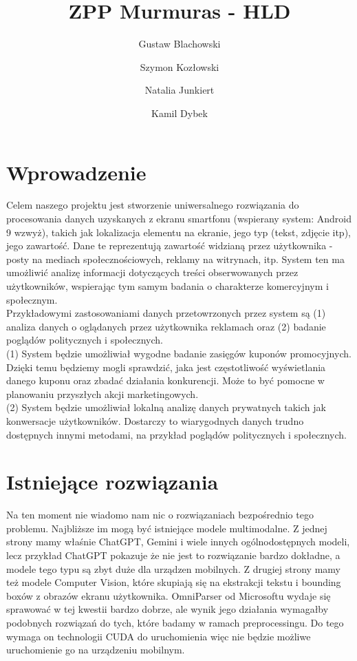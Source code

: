 \documentclass[12pt]{article}
\title{ZPP Murmuras - HLD}
\author{Gustaw Blachowski \and Szymon Kozłowski \and Natalia Junkiert \and Kamil Dybek}
\date{}
\begin{document}
\maketitle

\section*{Wprowadzenie}

Celem naszego projektu jest stworzenie uniwersalnego rozwiązania do procesowania danych uzyskanych z ekranu smartfonu (wspierany system: Android 9 wzwyż), takich jak lokalizacja elementu na ekranie, jego typ (tekst, zdjęcie itp), jego zawartość. Dane te reprezentują zawartość widzianą przez użytkownika - posty na mediach społecznościowych, reklamy na witrynach, itp. System ten ma umożliwić analizę informacji dotyczących treści obserwowanych przez użytkowników, wspierając tym samym badania o charakterze komercyjnym i społecznym. \\

Przykładowymi zastosowaniami danych przetowrzonych przez system są (1) analiza danych o oglądanych przez użytkownika reklamach oraz (2) badanie poglądów politycznych i społecznych. \\

(1) System będzie umożliwiał wygodne badanie zasięgów kuponów promocyjnych. Dzięki temu będziemy mogli sprawdzić, jaka jest częstotliwość wyświetlania danego kuponu oraz zbadać działania konkurencji. Może to być pomocne w planowaniu przyszłych akcji marketingowych. \\

(2) System będzie umożliwiał lokalną analizę danych prywatnych takich jak konwersacje użytkowników. Dostarczy to wiarygodnych danych trudno dostępnych innymi metodami, na przykład poglądów politycznych i społecznych.


\section*{Istniejące rozwiązania}
Na ten moment nie wiadomo nam nic o rozwiązaniach bezpośrednio tego problemu. Najbliższe im mogą być istniejące modele multimodalne.
Z jednej strony mamy właśnie ChatGPT, Gemini i wiele innych ogólnodostępnych modeli, lecz przykład ChatGPT pokazuje że nie jest to rozwiązanie bardzo dokładne, a modele tego typu są zbyt duże dla urządzen mobilnych. Z drugiej strony mamy też modele Computer Vision, które skupiają się na ekstrakcji tekstu i bounding boxów z obrazów ekranu użytkownika. OmniParser od Microsoftu wydaje się sprawować w tej kwestii bardzo dobrze, ale wynik jego działania wymagałby podobnych rozwiązań do tych, które badamy w ramach preprocessingu. Do tego wymaga on technologii CUDA do uruchomienia więc nie będzie możliwe uruchomienie go na urządzeniu mobilnym.
\end{document}
